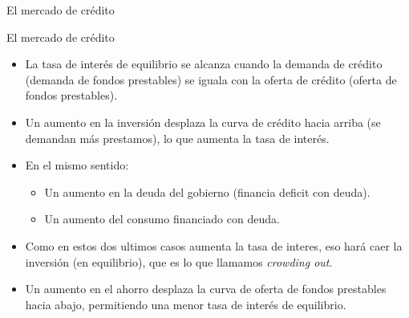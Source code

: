 \documentclass{beamer}
\begin{document}
\begin{frame}{El mercado de crédito}
    \begin{center}
        \begin{figure}[H]
        \renewcommand{\figurename}{Figure}
            \begin{center}
            \end{center}
        \end{figure}
    \end{center}  
\end{frame}

\begin{frame}{El mercado de crédito}
    \begin{itemize}
        \item La tasa de interés de equilibrio se alcanza cuando la demanda de crédito (demanda de fondos prestables) se iguala con la oferta de crédito (oferta de fondos prestables).
        \item Un aumento en la inversión desplaza la curva de crédito hacia arriba (se demandan más prestamos), lo que aumenta la tasa de interés.
        \item En el mismo sentido:
        \begin{itemize}
            \item Un aumento en la deuda del gobierno (financia deficit con deuda).
            \item Un aumento del consumo financiado con deuda.
        \end{itemize}
        \item Como en estos dos ultimos casos aumenta la tasa de interes, eso hará caer la inversión (en equilibrio), que es lo que llamamos \textit{crowding out}.
        \item Un aumento en el ahorro desplaza la curva de oferta de fondos prestables hacia abajo, permitiendo una menor tasa de interés de equilibrio.
    \end{itemize}
    
\end{frame}
\end{document}
